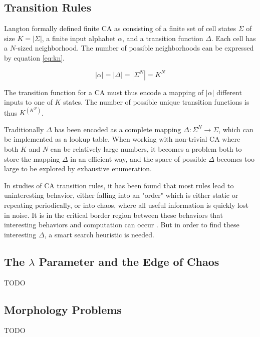 %

\subsection{Transition Rules}
\label{sec:transitions}
Langton \cite{langton-1990} formally defined finite CA as consisting of a finite set of cell states $\Sigma$ of size $K = |\Sigma|$,
a finite input alphabet $\alpha$, and a transition function $\Delta$.
Each cell has a $N$-sized neighborhood.
The number of possible neighborhoods can be expressed by equation \eqref{eq:kn}.

\begin{equation}\label{eq:kn}
    |\alpha| = |\Delta| = |\Sigma^N| = K^N
\end{equation}

The transition function for a CA must thus encode a mapping of $|\alpha|$ different inputs to one of $K$ states.
The number of possible unique transition functions is thus $K^{(K^N)}$.

Traditionally $\Delta$ has been encoded as a complete mapping $\Delta: \Sigma^N \rightarrow \Sigma$, which can be implemented as a lookup table.
When working with non-trivial CA where both $K$ and $N$ can be relatively large numbers,
it becomes a problem both to store the mapping $\Delta$ in an efficient way,
and the space of possible $\Delta$ becomes too large to be explored by exhaustive enumeration.

In studies of CA transition rules, it has been found that most rules lead to uninteresting behavior,
either falling into an "order" which is either static or repeating periodically,
or into chaos, where all useful information is quickly lost in noise.
It is in the critical border region between these behaviors that interesting behaviors and computation can occur \cite{langton-1990}.
But in order to find these interesting $\Delta$, a smart search heuristic is needed.

\subsection{The $\lambda$ Parameter and the Edge of Chaos}
TODO

\subsection{Morphology Problems}
TODO


